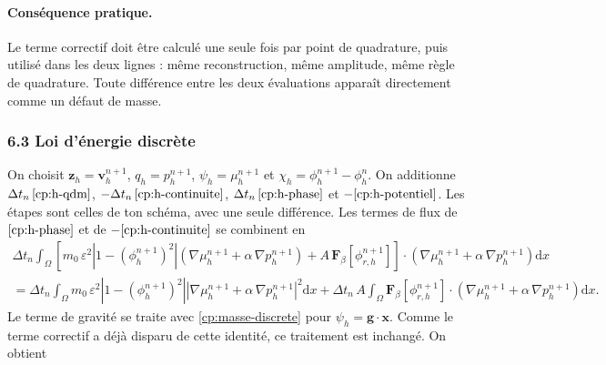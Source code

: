 \paragraph{Conséquence pratique.} Le terme correctif doit être calculé une seule fois par point de quadrature, puis utilisé dans les deux lignes : même reconstruction, même amplitude, même règle de quadrature. Toute différence entre les deux évaluations apparaît directement comme un défaut de masse.

\subsubsection*{6.3 Loi d'énergie discrète}

On choisit $\mathbf{z}_h=\mathbf{v}_h^{n+1}$, $q_h=p_h^{n+1}$, $\psi_h=\mu_h^{n+1}$ et $\chi_h=\phi_h^{n+1}-\phi_h^{n}$. On additionne $\Delta t_n\,\eqref{cp:h-qdm}$, $-\Delta t_n\,\eqref{cp:h-continuite}$, $\Delta t_n\,\eqref{cp:h-phase}$ et $-\eqref{cp:h-potentiel}$. Les étapes sont celles de ton schéma, avec une seule différence. Les termes de flux de $\eqref{cp:h-phase}$ et de $-\eqref{cp:h-continuite}$ se combinent en
\begin{multline}
  \Delta t_n\int_{\Omega}\left[m_0\,\varepsilon^{2}\left|1-(\phi_h^{n+1})^{2}\right|
    \left(\nabla\mu_h^{n+1} + \alpha\,\nabla p_h^{n+1}\right)
    + A\,\mathbf{F}_\beta[\phi_{r,h}^{n+1}]\right]\cdot\left(\nabla\mu_h^{n+1} + \alpha\,\nabla p_h^{n+1}\right)\mathrm{d}x\\
  = \Delta t_n\int_{\Omega} m_0\,\varepsilon^{2}\left|1-(\phi_h^{n+1})^{2}\right|
    \left|\nabla\mu_h^{n+1} + \alpha\,\nabla p_h^{n+1}\right|^{2}\mathrm{d}x
  + \Delta t_n\,A\int_{\Omega}\mathbf{F}_\beta[\phi_{r,h}^{n+1}]\cdot\left(\nabla\mu_h^{n+1} + \alpha\,\nabla p_h^{n+1}\right)\mathrm{d}x .
\end{multline}
Le terme de gravité se traite avec \eqref{cp:masse-discrete} pour $\psi_h=\mathbf{g}\cdot\mathbf{x}$. Comme le terme correctif a déjà disparu de cette identité, ce traitement est inchangé. On obtient
